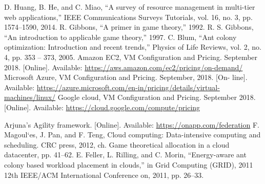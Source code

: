 \documentclass[conference]{IEEEtran}
\begin{document}
\begin{thebibliography}{00}
 D. Huang, B. He, and C. Miao, “A survey of resource management in
multi-tier web applications,” IEEE Communications Surveys Tutorials,
vol. 16, no. 3, pp. 1574–1590, 2014.
\newline
{} R. Gibbons, “A primer in game theory,” 1992.
\newline
{} R. S. Gibbons, “An introduction to applicable game theory,” 1997.
\newline
{} C. Blum, “Ant colony optimization: Introduction and recent trends,”
Physics of Life Reviews, vol. 2, no. 4, pp. 353 – 373, 2005.
\newline
{} Amazon EC2, VM Configuration and Pricing. September 2018.
[Online]. Available: \url{https://aws.amazon.com/ec2/pricing/on-demand/}
\newline
{} Microsoft Azure, VM Configuration and Pricing. September, 2018. [On-
line]. Available: \url{https://azure.microsoft.com/en-in/pricing/details/virtual-
machines/linux/}
\newline
{} Google cloud, VM Configuration and Pricing. September 2018.
[Online]. Available: \url{https://cloud.google.com/compute/pricing}
\newline

  Arjuna’s Agility framework. [Online]. Available:
\href{https://onapp.com/federation}{https://onapp.com/federation}
\newline
{} F. Magoul`es, J. Pan, and F. Teng, Cloud computing: Data-intensive
computing and scheduling. CRC press, 2012, ch. Game theoretical
allocation in a cloud datacenter, pp. 41–62.
\newline
{}E. Feller, L. Rilling, and C. Morin, “Energy-aware ant colony based
workload placement in clouds,” in Grid Computing (GRID), 2011 12th
IEEE/ACM International Conference on, 2011, pp. 26–33.

\end{thebibliography}
\end{document}
